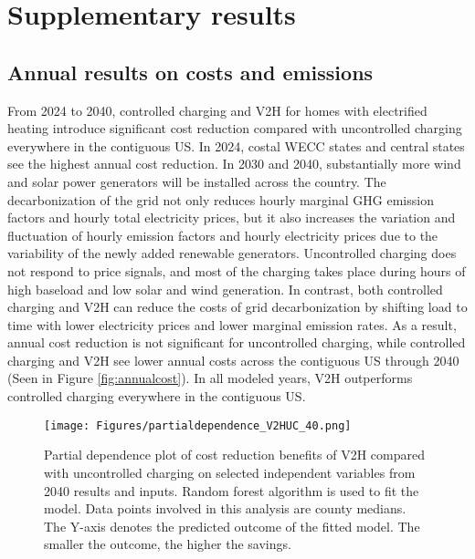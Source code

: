 \documentclass[11pt,preprint]{elsarticle}
\begin{document}
\setcounter{equation}{0}
\setcounter{figure}{0}
\setcounter{table}{0}
\setcounter{section}{0}

\section{Supplementary results}

\subsection{Annual results on costs and emissions}
From 2024 to 2040, controlled charging and V2H for homes with electrified heating introduce significant cost reduction compared with uncontrolled charging everywhere in the contiguous US. In 2024, costal WECC states and central states see the highest annual cost reduction. In 2030 and 2040, substantially more wind and solar power generators will be installed across the country. The decarbonization of the grid not only reduces hourly marginal GHG emission factors and hourly total electricity prices, but it also increases the variation and fluctuation of hourly emission factors and hourly electricity prices due to the variability of the newly added renewable generators. Uncontrolled charging does not respond to price signals, and most of the charging takes place during hours of high baseload and low solar and wind generation. In contrast, both controlled charging and V2H can reduce the costs of grid decarbonization by shifting load to time with lower electricity prices and lower marginal emission rates. As a result, annual cost reduction is not significant for uncontrolled charging, while controlled charging and V2H see lower annual costs  across the contiguous US through 2040 (Seen in Figure \ref{fig:annualcost}).  In all modeled years, V2H outperforms controlled charging everywhere in the contiguous US. 

\newpage
\begin{figure*}
    \centering
    \texttt{[image: Figures/partialdependence\_V2HUC\_40.png]}
    \caption{Partial dependence plot of cost reduction benefits of V2H compared with uncontrolled charging on selected independent variables from 2040 results and inputs. Random forest algorithm is used to fit the model. Data points involved in this analysis are county medians. The Y-axis denotes the predicted outcome of the fitted model. The smaller the outcome, the higher the savings.}
    \label{fig:40pdp}
\end{figure*}
\newpage
\end{document}
